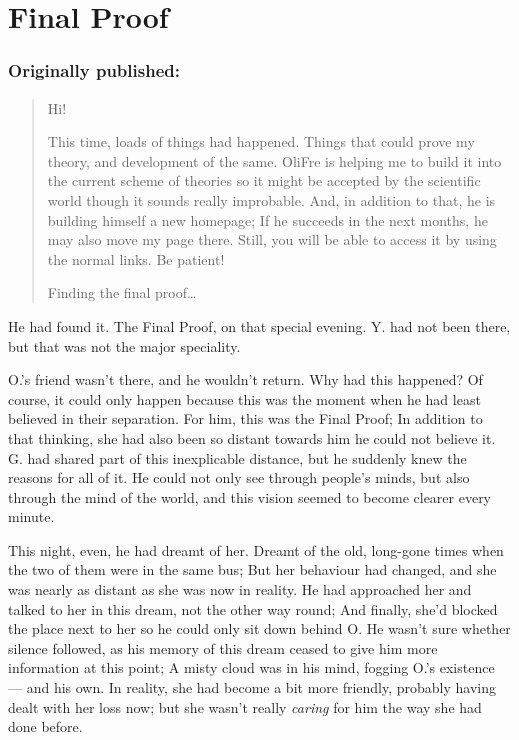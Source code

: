 \chapter{Final Proof}
\label{cha:final-proof}
\subsection*{Originally published: }
\begin{quote}
Hi! 

This time, loads of things had happened. Things that could prove my theory, and development of the same. OliFre is helping me to build it into the current scheme of theories so it might be accepted by the scientific world though it sounds really improbable. 
And, in addition to that, he is building himself a new homepage; If he succeeds in the next months, he may also move my page there. Still, you will be able to access it by using the normal links. Be patient!

Finding the final proof\ldots
\end{quote}

He had found it. 
The Final Proof, on that special evening. 
Y. had not been there, but that was not the major speciality.

O.'s friend wasn't there, and he wouldn't return. Why had this happened? Of course, it could only happen because this was the moment when he had least believed in their separation. For him, this was the Final Proof; In addition to that thinking, she had also been so distant towards him he could not believe it. G. had shared part of this inexplicable distance, but he suddenly knew the reasons for all of it. He could not only see through people's minds, but also through the mind of the world, and this vision seemed to become clearer every minute.

This night, even, he had dreamt of her. Dreamt of the old, long-gone times when the two of them were in the same bus; But her behaviour had changed, and she was nearly as distant as she was now in reality. He had approached her and talked to her in this dream, not the other way round; And finally, she'd blocked the place next to her so he could only sit down behind O. He wasn't sure whether silence followed, as his memory of this dream ceased to give him more information at this point; A misty cloud was in his mind, fogging O.'s existence --- and his own.
In reality, she had become a bit more friendly, probably having dealt with her loss now; but she wasn't really \emph{caring} for him the way she had done before.

